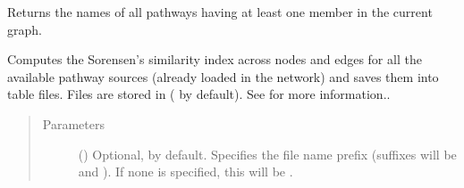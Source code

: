 \documentclass[letterpaper,10pt,english]{sphinxmanual}
\begin{document}
\begin{fulllineitems}
\begin{fulllineitems}
\label{\detokenize{reference:pypath.main.PyPath.pathway_names}}
Returns the names of all pathways having at least one member
in the current graph.

\end{fulllineitems}


\begin{fulllineitems}
\label{\detokenize{reference:pypath.main.PyPath.pathway_similarity}}
Computes the Sorensen’s similarity index across nodes and edges
for all the available pathway sources (already loaded in the
network) and saves them into table files. Files are stored in
 ( by default).
See {\hyperref[\detokenize{reference:pypath.main.PyPath.sorensen_pathways}]{}} for more
information..
\begin{quote}\begin{description}
\item[{Parameters}] \leavevmode
{} () \textendash{} Optional,  by default. Specifies the file name
prefix (suffixes will be  and ). If
none is specified, this will be
.

\end{description}\end{quote}

\end{fulllineitems}


\begin{fulllineitems}
\label{\detokenize{reference:pypath.main.PyPath.pathways_table}}
\end{fulllineitems}


\end{fulllineitems}
\end{document}
